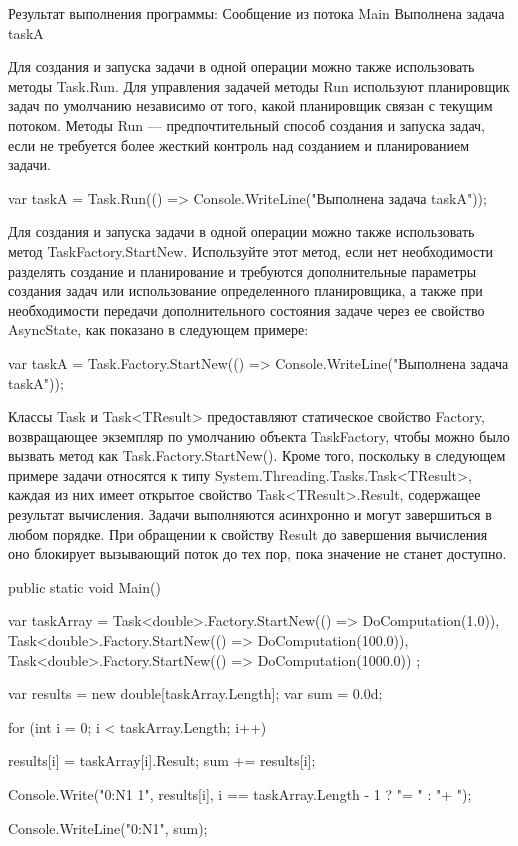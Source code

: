 Результат выполнения программы:
Сообщение из потока Main
Выполнена задача taskA

Для создания и запуска задачи в одной операции можно также использовать методы Task.Run. Для управления задачей методы Run используют планировщик задач по умолчанию независимо от того, какой планировщик связан с текущим потоком. Методы Run — предпочтительный способ создания и запуска задач, если не требуется более жесткий контроль над созданием и планированием задачи.

var taskA = Task.Run(() => Console.WriteLine("Выполнена задача taskA"));


Для создания и запуска задачи в одной операции можно также использовать метод TaskFactory.StartNew. Используйте этот метод, если нет необходимости разделять создание и планирование и требуются дополнительные параметры создания задач или использование определенного планировщика, а также при необходимости передачи дополнительного состояния задаче через ее свойство AsyncState, как показано в следующем примере:

var taskA = Task.Factory.StartNew(() => Console.WriteLine("Выполнена задача taskA"));

Классы Task и Task<TResult> предоставляют статическое свойство Factory, возвращающее экземпляр по умолчанию объекта TaskFactory, чтобы можно было вызвать метод как Task.Factory.StartNew(). Кроме того, поскольку в следующем примере задачи относятся к типу System.Threading.Tasks.Task<TResult>, каждая из них имеет открытое свойство Task<TResult>.Result, содержащее результат вычисления. Задачи выполняются асинхронно и могут завершиться в любом порядке. При обращении к свойству Result до завершения вычисления оно блокирует вызывающий поток до тех пор, пока значение не станет доступно.

public static void Main()
{
    var taskArray = { 
        Task<double>.Factory.StartNew(() => DoComputation(1.0)),
        Task<double>.Factory.StartNew(() => DoComputation(100.0)), 
        Task<double>.Factory.StartNew(() => DoComputation(1000.0)) 
    };

    var results = new double[taskArray.Length];
    var sum = 0.0d;
    
    for (int i = 0; i < taskArray.Length; i++) {
        results[i] = taskArray[i].Result;
        sum += results[i];
        
        Console.Write("{0:N1} {1}", results[i], 
            i == taskArray.Length - 1 ? "= " : "+ ");
    }
    Console.WriteLine("{0:N1}", sum);
}

